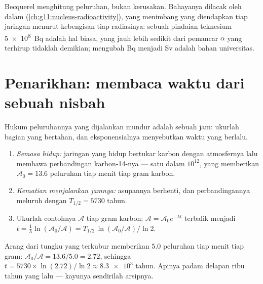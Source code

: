 \begin{remark}\label{rem:g12:radioactive-decay:dose}
Becquerel menghitung peluruhan, bukan kerusakan. Bahayanya dilacak oleh  dalam
 (\cref{ch:g11:nucleus-radioactivity}), yang menimbang  yang
diendapkan tiap  jaringan menurut kebengisan tiap radiasinya: sebuah
pindaian teknesium \qty{5e8}{Bq} adalah hal biasa,  yang jauh lebih sedikit dari
pemancar $\alpha$ yang terhirup tidaklah demikian; mengubah \unit{Bq} menjadi \unit{Sv} adalah
bahan universitas.
\end{remark}

\section{Penarikhan: membaca waktu dari sebuah nisbah}

Hukum peluruhannya yang dijalankan mundur adalah sebuah jam: ukurlah bagian yang bertahan,
dan eksponensialnya menyebutkan waktu yang berlalu.

\begin{method}\label{met:g12:radioactive-decay:carbon}
\begin{enumerate}
  \item \emph{Semasa hidup:} jaringan yang hidup bertukar karbon dengan atmosfernya
        lalu membawa perbandingan karbon-14-nya --- satu  dalam $10^{12}$,
        yang memberikan $\mathcal A_0 = 13.6$ peluruhan tiap menit tiap gram karbon.
  \item \emph{Kematian menjalankan jamnya:} asupannya berhenti, dan perbandingannya
        meluruh dengan $T_{1/2} = \num{5730}$ tahun.
  \item Ukurlah  contohnya $\mathcal A$ tiap gram karbon;
        $\mathcal A = \mathcal A_0 e^{-\lambda t}$ terbalik menjadi
        $t = \frac{1}{\lambda}\ln(\mathcal A_0/\mathcal A)
        = T_{1/2}\,\ln(\mathcal A_0/\mathcal A)/\ln 2$.
\end{enumerate}
\end{method}

\begin{example}\label{ex:g12:radioactive-decay:hearth}
Arang dari tungku yang terkubur memberikan $5.0$ peluruhan tiap menit tiap gram:
$\mathcal A_0/\mathcal A = 13.6/5.0 = 2.72$, sehingga
$t = \num{5730} \times \ln(2.72)/\ln 2 \approx \num{8.3e3}$ tahun. Apinya
padam delapan ribu tahun yang lalu --- kayunya sendirilah arsipnya.
\end{example}

